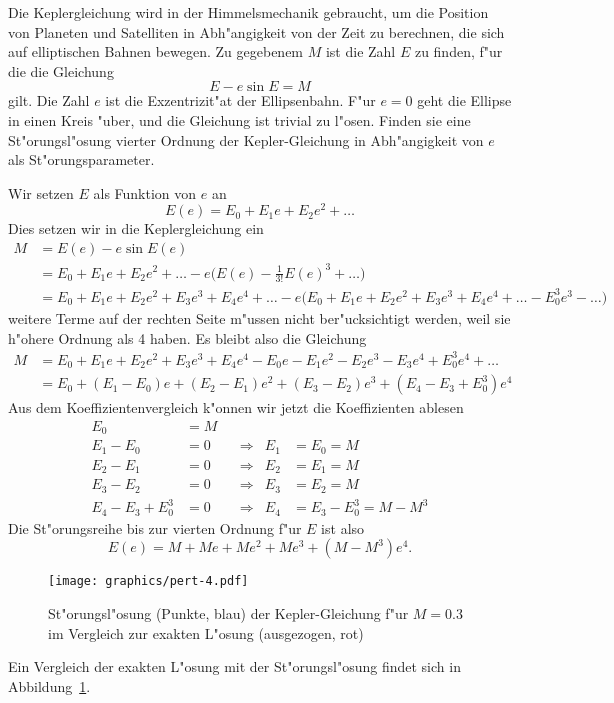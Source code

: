 Die Keplergleichung wird in der Himmelsmechanik gebraucht, um die 
Position von Planeten und Satelliten in Abh"angigkeit von der Zeit
zu berechnen, die sich auf elliptischen Bahnen bewegen.
Zu gegebenem $M$ ist die Zahl $E$ zu finden, f"ur die die Gleichung
\[
E-e\sin E=M
\]
gilt.
Die Zahl $e$ ist die Exzentrizit"at der Ellipsenbahn. F"ur $e=0$
geht die Ellipse in einen Kreis "uber, und die Gleichung ist trivial
zu l"osen. Finden sie eine St"orungsl"osung vierter Ordnung
der Kepler-Gleichung in Abh"angigkeit von $e$ als St"orungsparameter.

\begin{loesung}
Wir setzen $E$ als Funktion von $e$ an
\[
E(e)
=
E_0+E_1e+E_2e^2+\dots
\]
Dies setzen wir in die Keplergleichung ein
\begin{align*}
M
&=
E(e)-e\sin E(e)
\\
&=
E_0+E_1e+E_2e^2+\dots
-e\biggl(
E(e)-\frac1{3!}E(e)^3+\dots
\biggr)
\\
&=
E_0+E_1e+E_2e^2+E_3e^3+E_4e^4+\dots
-e\biggl(
E_0+E_1e+E_2e^2+E_3e^3+E_4e^4+\dots
-E_0^3e^3-\dots
\biggr)
\end{align*}
weitere Terme auf der rechten Seite m"ussen nicht ber"ucksichtigt
werden, weil sie h"ohere Ordnung als 4 haben.
Es bleibt also die Gleichung
\begin{align*}
M
&=
E_0+E_1e+E_2e^2+E_3e^3+E_4e^4
-E_0e-E_1e^2-E_2e^3-E_3e^4
+E_0^3e^4+\dots
\\
&=
E_0
+(E_1-E_0)e
+(E_2-E_1)e^2
+(E_3-E_2)e^3
+(E_4-E_3+E_0^3)e^4
\end{align*}
Aus dem Koeffizientenvergleich k"onnen wir jetzt die Koeffizienten ablesen
\begin{equation}
\begin{aligned}
E_0&=M
\\
E_1-E_0&=0&&\Rightarrow&E_1&=E_0=M\\
E_2-E_1&=0&&\Rightarrow&E_2&=E_1=M\\
E_3-E_2&=0&&\Rightarrow&E_3&=E_2=M\\
E_4-E_3+E_0^3&=0&&\Rightarrow&E_4&=E_3-E_0^3=M-M^3
\end{aligned}
\end{equation}
Die St"orungsreihe bis zur vierten Ordnung f"ur $E$ ist also
\[
E(e)=M+Me+Me^2+Me^3+(M-M^3)e^4.
\]
\begin{figure}
\centering
\texttt{[image: graphics/pert-4.pdf]}
\caption{St"orungsl"osung (Punkte, blau) der Kepler-Gleichung f"ur $M=0.3$
im Vergleich zur exakten L"osung (ausgezogen, rot)
\label{10001:kepler}}
\end{figure}
Ein Vergleich der exakten L"osung mit der St"orungsl"osung findet sich
in Abbildung~\ref{10001:kepler}.
\end{loesung}

